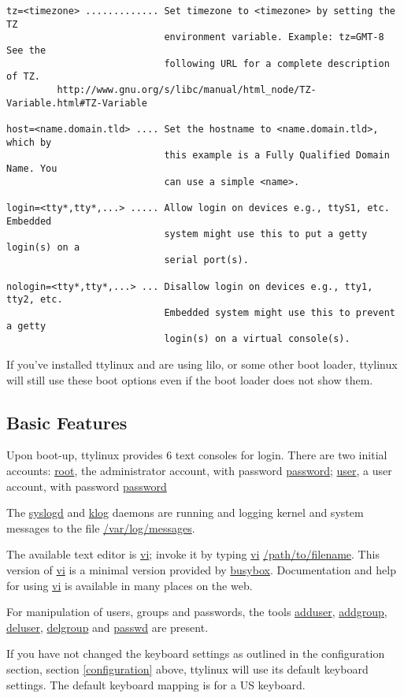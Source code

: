 \documentclass[10pt]{article}
\begin{document}
\begin{lstlisting}
tz=<timezone> ............. Set timezone to <timezone> by setting the TZ
                            environment variable. Example: tz=GMT-8  See the
                            following URL for a complete description of TZ.
         http://www.gnu.org/s/libc/manual/html_node/TZ-Variable.html#TZ-Variable

host=<name.domain.tld> .... Set the hostname to <name.domain.tld>, which by
                            this example is a Fully Qualified Domain Name. You
                            can use a simple <name>.

login=<tty*,tty*,...> ..... Allow login on devices e.g., ttyS1, etc. Embedded
                            system might use this to put a getty login(s) on a
                            serial port(s).

nologin=<tty*,tty*,...> ... Disallow login on devices e.g., tty1, tty2, etc.
                            Embedded system might use this to prevent a getty
                            login(s) on a virtual console(s).
\end{lstlisting}

If you've installed ttylinux and are using lilo, or some other boot loader,
ttylinux will still use these boot options even if the boot loader does not
show them.

\subsection{Basic Features}

Upon boot-up, ttylinux provides 6 text consoles for login. There are two
initial accounts: \url{root}, the administrator account, with password
\url{password}; \url{user}, a user account, with password \url{password}

The \url{syslogd} and \url{klog} daemons are running and logging kernel and
system messages to the file \url{/var/log/messages}.

The available text editor is \url{vi}; invoke it by typing \url{vi}
\url{/path/to/filename}. This version of \url{vi} is a minimal version provided
by \url{busybox}. Documentation and help for using \url{vi} is available in
many places on the web.

For manipulation of users, groups and passwords, the tools \url{adduser},
\url{addgroup}, \url{deluser}, \url{delgroup} and \url{passwd} are present.

If you have not changed the keyboard settings as outlined in the configuration
section, section \ref{configuration} above, ttylinux will use its default
keyboard settings. The default keyboard mapping is for a US keyboard.
\end{document}
